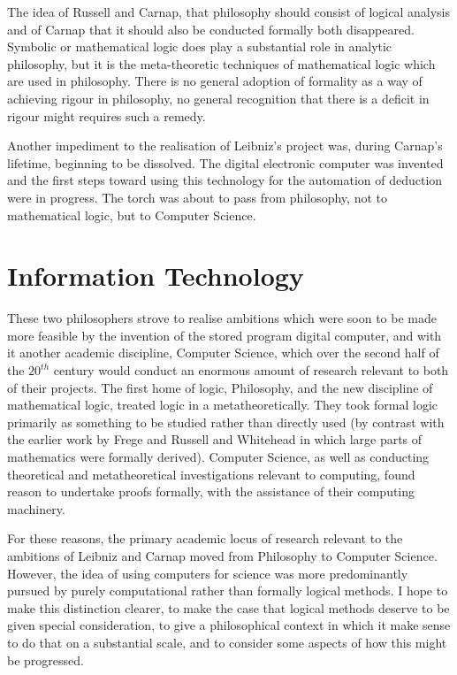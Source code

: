 The idea of Russell and Carnap, that philosophy should consist of
logical analysis and of Carnap that it should also be conducted
formally both disappeared. 
Symbolic or mathematical logic does play a substantial role in
analytic philosophy, but it is the meta-theoretic techniques of
mathematical logic which are used in philosophy. 
There is no general adoption of formality as a way of achieving rigour
in philosophy, no general recognition that there is a deficit in
rigour might requires such a remedy. 

Another impediment to the realisation of Leibniz's project was, during
Carnap's lifetime, beginning to be dissolved. 
The digital electronic computer was invented and the first steps
toward using this technology for the automation of deduction were in
progress. 
The torch was about to pass from philosophy, not to mathematical
logic, but to Computer Science. 

\section{Information Technology}

These two philosophers strove to realise ambitions which were soon to
be made more feasible by the invention of the stored program digital
computer, and with it another academic discipline, Computer Science,
which over the second half of the $20^{th}$ century would conduct an
enormous amount of research relevant to both of their projects.
The first home of logic, Philosophy, and the new discipline of
mathematical logic, treated logic in a metatheoretically.
They took formal logic primarily as something to be studied rather
than directly used (by contrast with the earlier work by Frege and
Russell and Whitehead in which large parts of mathematics were
formally derived).
Computer Science, as well as conducting theoretical and
metatheoretical investigations relevant to computing, found reason to
undertake proofs formally, with the assistance of their computing
machinery.

For these reasons, the primary academic locus of research relevant to the
ambitions of Leibniz and Carnap moved from Philosophy to Computer
Science.
However, the idea of using computers for science was more
predominantly pursued by purely computational rather than formally
logical methods.
I hope to make this distinction clearer, to make the case that
logical methods deserve to be given special consideration, to give a
philosophical context in which it make sense to do that on a
substantial scale, and to consider some aspects of how this might be progressed.


